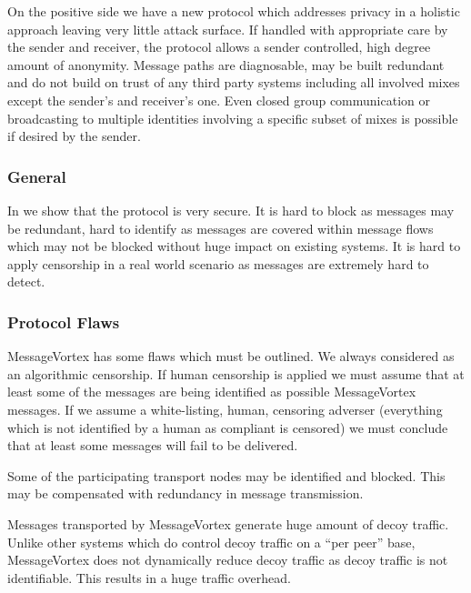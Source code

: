 \documentclass[9pt,journal,compsoc]{IEEEtran}
\begin{document}
On the positive side we have a new protocol which addresses privacy in a holistic approach leaving very little attack surface. If handled with appropriate care by the sender and receiver, the protocol allows a sender controlled, high degree amount of anonymity. Message paths are diagnosable, may be built redundant and do not build on trust of any third party systems including all involved mixes except the sender's and receiver's one. Even closed group communication or broadcasting to multiple identities involving a specific subset of mixes is possible if desired by the sender.

\subsubsection{General}
In \cite{messageVortex} we show that the protocol is very secure. It is hard to block as messages may be redundant, hard to identify as messages are covered within message flows which may not be blocked without huge impact on existing systems. It is hard to apply censorship in a real world scenario as messages are extremely hard to detect. 

\subsubsection{Protocol Flaws}
MessageVortex has some flaws which must be outlined. We always considered as an algorithmic censorship. If human censorship is applied we must assume that at least some of the messages are being identified as possible MessageVortex messages. If we assume a white-listing, human, censoring adverser (everything which is not identified by a human as compliant is censored) we must conclude that at least some messages will fail to be delivered. 

Some of the participating transport nodes may be identified and blocked. This may be compensated with redundancy in message transmission. 

Messages transported by MessageVortex generate huge amount of decoy traffic. Unlike other systems which do control decoy traffic on a ``per peer'' base, MessageVortex does not dynamically reduce decoy traffic as decoy traffic is not identifiable. This results in a huge traffic overhead.


\end{document}
